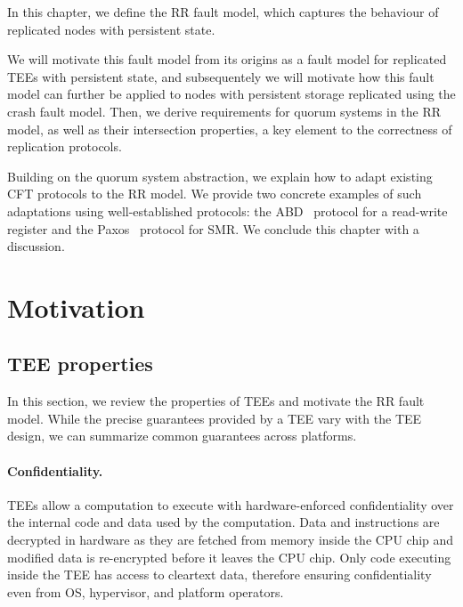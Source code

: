 \label{chap:model}
\cleardoublepage{}

In this chapter, we define the \ac{RR} fault model, which
captures the behaviour of replicated nodes with persistent state.

We will motivate this fault model from its origins as a fault model
for replicated \acp{TEE} with persistent state, and subsequentely
we will motivate how this fault model can further be applied to
nodes with persistent storage replicated using the crash fault
model. Then, we derive requirements for quorum systems in the
\ac{RR} model, as well as their intersection properties, a key element to the
correctness of replication protocols.

Building on the quorum system abstraction, we explain how to
adapt existing \ac{CFT} protocols to the \ac{RR} model. We
provide two concrete examples of such adaptations using
well-established protocols: the \ac{ABD}~\cite{abd} protocol for
a read-write register and the Paxos~\cite{paxos} protocol for
\ac{SMR}. We conclude this chapter with a discussion.

\section{Motivation}\label{sec:motivation}

\subsection{\ac{TEE} properties}\label{ssec:tee_motivation}

In this section, we review the properties of \acp{TEE} and motivate the
\ac{RR} fault model. While the precise guarantees provided by a
\ac{TEE} vary with the \ac{TEE} design, we can summarize common guarantees across platforms.

\paragraph{Confidentiality.} \acp{TEE} allow a computation to execute with
hardware-enforced confidentiality over the internal code and data used
by the computation. Data and instructions are decrypted in hardware as
they are fetched from memory inside the CPU chip and modified data is
re-encrypted before it leaves the CPU chip. Only code executing inside
the \ac{TEE} has access to cleartext data, therefore ensuring
confidentiality even from \ac{OS}, hypervisor, and platform
operators.

